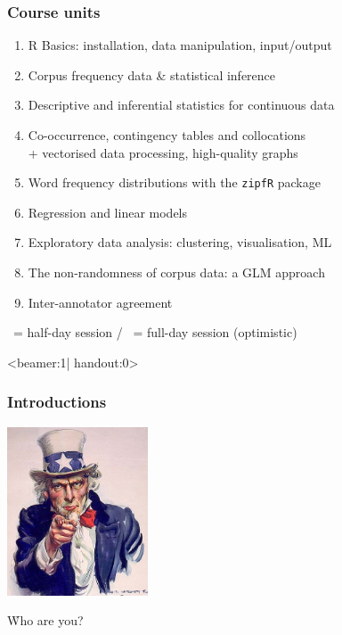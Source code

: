 \documentclass[t]{beamer} %
\begin{document}
{
\newcommand{\halfday}{\primary{\textsc{(h)}}}
\newcommand{\fullday}{\primary{\textsc{(f)}}}
\begin{frame}
  \frametitle{Course units}
  
  \begin{enumerate}
  \item R Basics: installation, data manipulation, input/output \halfday
  \item Corpus frequency data \& statistical inference \halfday
  \item Descriptive and inferential statistics for continuous data \fullday
  \item Co-occurrence, contingency tables and collocations \fullday\\
    + vectorised data processing, high-quality graphs
  \item Word frequency distributions with the \texttt{zipfR} package \halfday
  \item Regression and linear models \fullday
  \item Exploratory data analysis: clustering, visualisation, ML \halfday
  \item The non-randomness of corpus data: a GLM  approach \halfday
  \item Inter-annotator agreement \halfday
  \end{enumerate}

  \gap
  \halfday\ = half-day session / \fullday\ = full-day session (optimistic)
\end{frame}
}

\begin{frame}<beamer:1| handout:0>
  \frametitle{Introductions}

  \begin{center}
    \includegraphics[height=5cm]{img/uncle-sam-wants-you}

    \vspace{5mm}
    \begin{Large}
      \h{Who are you?}
    \end{Large}
  \end{center}
\end{frame}
\end{document}
